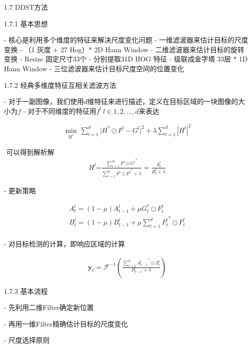 1.7 DDST方法




1.7.1 基本思想

- 核心是利用多个维度的特征来解决尺度变化问题
- 一维滤波器来估计目标的尺度变换
- （1 灰度 + 27 Hog）* 2D Hann Window
- 二维滤波器来估计目标的旋转变换
- Resize 固定尺寸33个
- 分别提取31D HOG 特征
- 级联成金字塔 33层 * 1D Hann Window
- 三位滤波器来估计目标尺度空间的位置变化

1.7.2 经典多维度特征互相关滤波方法

- 对于一副图像，我们使用$d$维特征来进行描述，定义在目标区域的一块图像的大小为$f$
- 对于不同维度的特征用$f^l\ l \in {1, 2, ..., d}$来表达

\begin{align}
\underset{{{H}^{*}}}{\mathop{\min }}\,\sum\limits_{l=1}^{d}{|{{H}^{*}}\odot{{F}^{l}}-{{G}^{l}}{{|}^{2}}}+\lambda \sum_{l=1}^{d}|H^{l}|^2
\end{align}

​	可以得到解析解
\begin{align}
H^l\text{=}\frac{\sum\limits_{i=1}^{m}{{{F}^{l}}\odot {G^{i}}^{{*}}}}{\sum\limits_{i=1}^{d}{{{F}^{i}}\odot {F^{i}}^{\text{*}}}+\lambda}=\frac{A^{l}_{t}}{B^{l}_{t}+\lambda}
\end{align}

- 更新策略

\begin{align}
A_t^l=(1-\mu)A_{t-1}^{l}+\mu G_{t}^{*}\odot F_{t}^{l}\\
B_t^l=(1-\mu)B_{t-1}^{l}+\mu \sum_{l=1}^{d}{F_{t}^{l}}^{*}\odot F_{t}^{l}\\
\end{align}

- 对目标检测的计算，即响应区域的计算

\begin{align}
\mathbf{y}_t=\mathcal{F}^{-1}(\frac{\sum_{i=1}^{d}{A^{l}_{t-1}}^*\odot Z^{l}_{t}}{B_{t-1}+\lambda})
\end{align}

1.7.3 基本流程

- 先利用二维Filter确定新位置

- 再用一维Filter精确估计目标的尺度变化

- 尺度选择原则

